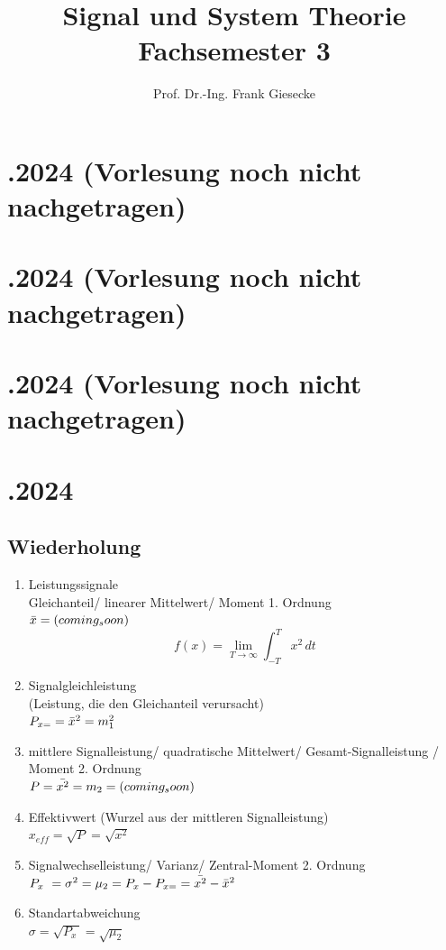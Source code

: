 \documentclass{article}
\title{Signal und System Theorie  \\ [1ex] \large Fachsemester 3}
\author{Prof. Dr.-Ing. Frank Giesecke}
\date{}
\begin{document}
\maketitle


\newpage
\section*{.2024 (Vorlesung noch nicht nachgetragen)}
\section*{.2024 (Vorlesung noch nicht nachgetragen)}
\section*{.2024 (Vorlesung noch nicht nachgetragen)}


\newpage
\section*{.2024}
\subsection*{Wiederholung}
\begin{enumerate}
	\item Leistungssignale \\
	Gleichanteil/ linearer Mittelwert/ Moment 1. Ordnung \\
	$\Bar{x} = (coming_soon)$
	\[ f(x) = \lim_{T\to\infty} \int_{-T}^{T} x^2 \,dt \]

	\item Signalgleichleistung \\
	(Leistung, die den Gleichanteil verursacht) \\
	$P_{x=} = \Bar{x}^2 = m_1^2$

	\item mittlere Signalleistung/ quadratische Mittelwert/ Gesamt-Signalleistung / Moment 2. Ordnung \\
	$P = \Bar{x^2} = m_2 = (coming_soon)$

	\item Effektivwert (Wurzel aus der mittleren Signalleistung) \\
	$x_{eff}=\sqrt{P}=\sqrt{x^2}$

	\item Signalwechselleistung/ Varianz/ Zentral-Moment 2. Ordnung \\
	$P_{x~}=\sigma^2 = \mu_2 = P_x - P_{x=} = \Bar{x^2} - \Bar{x}^2$

	\item Standartabweichung \\
	$\sigma = \sqrt{P_{x~}} = \sqrt{\mu_2}$
\end{enumerate}
\end{document}
